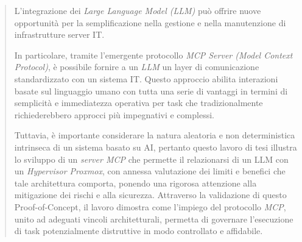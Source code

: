 \begin{abstract}
L'integrazione dei \textit{Large Language Model (LLM)} può offrire nuove opportunità per la semplificazione nella gestione e nella manutenzione di infrastrutture server IT.

In particolare, tramite l'emergente protocollo \textit{MCP Server (Model Context Protocol)}, è possibile fornire a un \textit{LLM} un layer di comunicazione standardizzato con un sistema IT.
Questo approccio abilita interazioni basate sul linguaggio umano con tutta una serie di vantaggi in termini di semplicità e immediatezza operativa per task che tradizionalmente richiederebbero approcci più impegnativi e complessi.

Tuttavia, è importante considerare la natura aleatoria e non deterministica intrinseca di un sistema basato su AI, pertanto questo lavoro di tesi illustra lo sviluppo di un \textit{server MCP} che permette il relazionarsi di un LLM con un \textit{Hypervisor Proxmox}, con annessa valutazione dei limiti e benefici che tale architettura comporta, ponendo una rigorosa attenzione alla mitigazione dei rischi e alla sicurezza. Attraverso la validazione di questo Proof-of-Concept, il lavoro dimostra come l'impiego del protocollo \textit{MCP}, unito ad adeguati vincoli architetturali, permetta di governare l'esecuzione di task potenzialmente distruttive in modo controllato e affidabile.
\end{abstract}